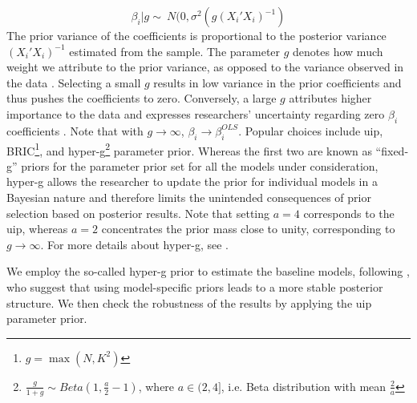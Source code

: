 \documentclass[a4paper,11pt]{article}
\begin{document}
\begin{equation}
\beta_{i}\vert g \sim\ N(0, \sigma^{2}(g(X_{i}'X_{i})^{-1}) 
\end{equation}
The prior variance of the coefficients is proportional to the posterior variance $(X_{i}'X_{i})^{-1}$ estimated from the sample. The parameter $g$ denotes how much weight we attribute to the prior variance, as opposed to the variance observed in the data \citep{FeldkircherZeugner2009}. Selecting a small $g$ results in low variance in the prior coefficients and thus pushes the coefficients to zero. Conversely, a large $g$ attributes higher importance to the data and expresses researchers' uncertainty regarding zero $\beta_{i}$ coefficients \citep{Zeugner2011}. Note that with $g \rightarrow \infty$, $\beta_{i} \rightarrow \beta^{OLS}_{i}$. Popular choices include \ac{uip}, BRIC\footnote{$g = \max({N, K^{2}})$}, and hyper-g\footnote{$\frac{g}{1+g} \sim Beta (1, \frac{a}{2} - 1)$, where $a \in (2,4]$, i.e. Beta distribution with mean $\frac{2}{a}$} parameter prior.
%
Whereas the first two are known as ``fixed-g'' priors for the parameter prior set for all the models under consideration, hyper-g allows the researcher to update the prior for individual models in a Bayesian nature and therefore limits the unintended consequences of prior selection based on posterior results. Note that setting $a=4$ corresponds to the \ac{uip}, whereas $a=2$ concentrates the prior mass close to unity, corresponding to $g \rightarrow \infty$. For more details about hyper-g, see \citet{Liangetal2008}.

We employ the so-called hyper-g prior to estimate the baseline models, following \citet{FeldkircherZeugner2009}, who suggest that using model-specific priors leads to a more stable posterior structure. We then check the robustness of the results by applying the \ac{uip} parameter prior.
\end{document}
